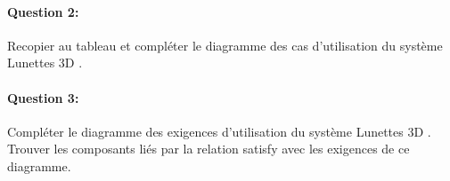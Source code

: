 \begin{center}
\end{center}

\paragraph{Question 2:} Recopier au tableau et compléter le diagramme des cas d'utilisation du système \og Lunettes 3D \fg.

\begin{center}
\end{center}

\paragraph{Question 3:} Compléter le diagramme des exigences d'utilisation du système \og Lunettes 3D \fg. Trouver les composants liés par la relation \og satisfy \fg avec les exigences de ce diagramme.

